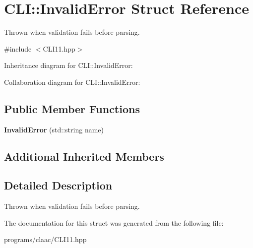 \hypertarget{struct_c_l_i_1_1_invalid_error}{}\section{C\+LI\+:\+:Invalid\+Error Struct Reference}
\label{struct_c_l_i_1_1_invalid_error}


Thrown when validation fails before parsing.  




{\ttfamily \#include $<$C\+L\+I11.\+hpp$>$}



Inheritance diagram for C\+LI\+:\+:Invalid\+Error\+:


Collaboration diagram for C\+LI\+:\+:Invalid\+Error\+:
\subsection*{Public Member Functions}
\begin{DoxyCompactItemize}
\item 
\mbox{\label{struct_c_l_i_1_1_invalid_error_af1d28f4b288b5fd32c6ca27c358cde48}} 
{\bfseries Invalid\+Error} (std\+::string name)
\end{DoxyCompactItemize}
\subsection*{Additional Inherited Members}


\subsection{Detailed Description}
Thrown when validation fails before parsing. 

The documentation for this struct was generated from the following file\+:\begin{DoxyCompactItemize}
\item 
programs/claac/C\+L\+I11.\+hpp\end{DoxyCompactItemize}
